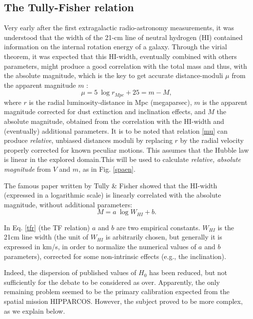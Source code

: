 \subsection{The Tully-Fisher relation}
\label{sec2.1}
Very early after the first extragalactic radio-astronomy measurements, it was understood  \cite{Ref6,Ref7} that the width of the 21-cm line of neutral hydrogen (HI) contained information on the internal rotation energy of a galaxy. Through the virial theorem, it was expected that this HI-width, eventually combined with others parameters, might  produce a good correlation with the total mass and thus, with the absolute magnitude, which is the key to get accurate distance-moduli $\mu$ from the apparent magnitude $m$ :
\begin{equation}
\mu = 5  \ \log r_{Mpc}+ 25 = m - M ,
\label{mu}
\end{equation}
where $r$ is the radial  luminosity-distance in Mpc (megaparsec), $ m$ is the apparent magnitude corrected for dust extinction and inclination effects, and $M$ the absolute magnitude, obtained from the correlation with the HI-width and (eventually) additional parameters. 
It is to be noted that relation \ref{mu} can produce {\it{relative}}, unbiased distances  moduli by replacing $r$ by the radial velocity properly corrected for known peculiar motions. This assumes that the Hubble law is linear in the explored domain.This will be used to calculate {\it{relative, absolute magnitude}} from $V$ and $m$, as in Fig. \ref{spaen}.

The famous paper written by Tully \& Fisher \cite{tf} showed that the HI-width (expressed in a logarithmic scale) is linearly correlated with the absolute magnitude, without additional parameters: 
\begin{equation}
M = a \ \log W_{HI} + b .
\label{tfr}
\end{equation}

In Eq. \ref{tfr}  (the TF relation)  $ a$ and $b$ are two empirical constants. $W_{HI}$ is the 21cm line width (the unit of  $W_{HI}$ is arbitrarily chosen, but generally it is expressed in km/s, in order to normalize the numerical values of $a$ and $b$ parameters), corrected for some non-intrinsic effects (e.g., the inclination). 

 Indeed, the dispersion of published values of $H_0$ has been reduced, but not sufficiently for the debate to be considered as over.
Apparently, the only remaining problem seemed to be the primary calibration expected from the spatial mission  HIPPARCOS. However, the subject proved to be more complex, as we explain below.

